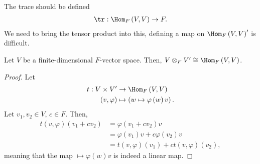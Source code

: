 \documentclass[10pt]{mypackage}
\begin{document}
  The trace should be defined
  \begin{align*}
    \tr: \Hom_{F}\left(V,V\right)\rightarrow F.
  \end{align*}
  We need to bring the tensor product into this, defining a map on $\Hom_{F}\left(V,V\right)'$ is difficult.
  \begin{lemma}
    Let $V$ be a finite-dimensional $F$-vector space. Then, $V\otimes_{F}V'\cong \Hom_{F}\left(V,V\right)$.
  \end{lemma}
  \begin{proof}
    Let
    \begin{align*}
      t: V\times V' &\rightarrow \Hom_{F}\left(V,V\right)\\
      \left(v,\varphi\right) &\mapsto \left(w \mapsto \varphi\left(w\right)v\right).
    \end{align*}
    Let $v_1,v_2\in V$, $c\in F$. Then,
    \begin{align*}
      t\left(v,\varphi\right)\left(v_1 + cv_2\right) &= \varphi\left(v_1 + cv_2\right)v\\
                                                  &= \varphi\left(v_1\right)v + c\varphi\left(v_2\right)v\\
                                                  &= t\left(v,\varphi\right)\left(v_1\right) + ct\left(v,\varphi\right)\left(v_2\right),
    \end{align*}
    meaning that the map $ \mapsto \varphi\left(w\right)v$ is indeed a linear map.\newline


\end{proof}
\end{document}
